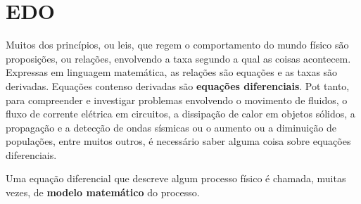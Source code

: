 \chapter{EDO}

\hspace{4cm}
\begin{minipage}{15cm}
Muitos dos princípios, ou leis, que regem o comportamento do mundo físico são proposições, ou relações, envolvendo a taxa segundo a qual as coisas acontecem. Expressas em linguagem matemática, as relações são equações e as taxas são derivadas. Equações contenso derivadas são \textbf{equações diferenciais}. Pot tanto, para compreender e investigar problemas envolvendo o movimento de fluidos, o fluxo de corrente elétrica em circuitos, a dissipação de calor em objetos sólidos, a propagação e a detecção de ondas sísmicas ou o aumento ou a diminuição de populações, entre muitos outros, é necessário saber alguma coisa sobre equações diferenciais.

Uma equação diferencial que descreve algum processo físico é chamada, muitas vezes, de \textbf{modelo matemático} do processo.\nocite{boyce2010equaccoes}
\end{minipage}









